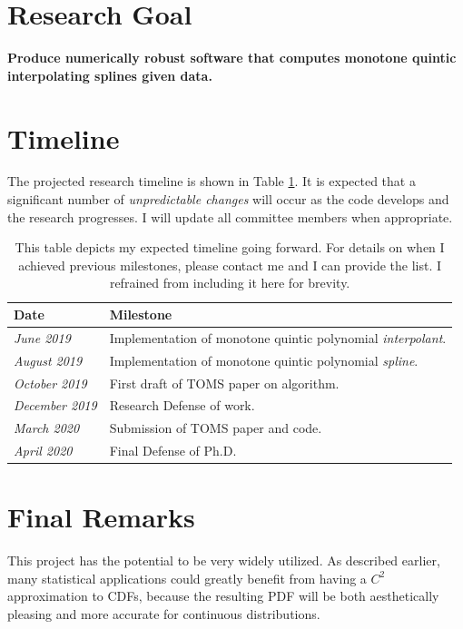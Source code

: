 \section{Research Goal}

{\centering \textbf{Produce numerically robust software that computes monotone quintic interpolating splines given data.}}

\section{Timeline}

The projected research timeline is shown in Table \ref{tab:timeline}. It is expected that a significant number of \textit{unpredictable changes} will occur as the code develops and the research progresses. I will update all committee members when appropriate.

\begin{table}
  \centering
  \renewcommand{\arraystretch}{1.2}
  \begin{tabular}{l l}
    \textbf{Date} & \textbf{Milestone} \\ \hline
    \textit{June 2019} & Implementation of monotone quintic polynomial \textit{interpolant}. \\
    \textit{August 2019} & Implementation of monotone quintic polynomial \textit{spline}. \\
    \textit{October 2019} & First draft of TOMS paper on algorithm. \\
    \textit{December 2019} & Research Defense of work. \\
    \textit{March 2020} & Submission of TOMS paper and code. \\
    \textit{April 2020} & Final Defense of Ph.D.
  \end{tabular}
  \caption{This table depicts my expected timeline going forward. For details on when I achieved previous milestones, please contact me and I can provide the list. I refrained from including it here for brevity.}
  \label{tab:timeline}
\end{table}

\section{Final Remarks}

This project has the potential to be very widely utilized. As described earlier, many statistical applications could greatly benefit from having a $C^2$ approximation to CDFs, because the resulting PDF will be both aesthetically pleasing and more accurate for continuous distributions.

